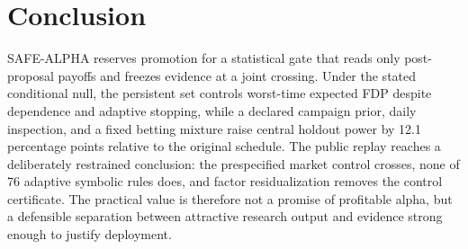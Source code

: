 \section{Conclusion}
\label{sec:conclusion}

SAFE-ALPHA reserves promotion for a statistical gate that reads only
post-proposal payoffs and freezes evidence at a joint crossing.  Under the
stated conditional null, the persistent set controls worst-time expected FDP
despite dependence and adaptive stopping, while a declared campaign prior,
daily inspection, and a fixed betting mixture raise central holdout power by
12.1 percentage points relative to the original schedule.  The public replay
reaches a deliberately restrained conclusion: the prespecified market control
crosses, none of 76 adaptive symbolic rules does, and factor residualization
removes the control certificate.  The practical value is therefore not a
promise of profitable alpha, but a defensible separation between attractive
research output and evidence strong enough to justify deployment.
